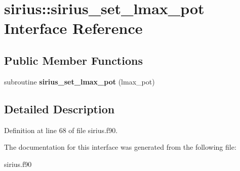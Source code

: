\hypertarget{interfacesirius_1_1sirius__set__lmax__pot}{}\section{sirius\+:\+:sirius\+\_\+set\+\_\+lmax\+\_\+pot Interface Reference}
\label{interfacesirius_1_1sirius__set__lmax__pot}
\subsection*{Public Member Functions}
\begin{DoxyCompactItemize}
\item 
\hypertarget{interfacesirius_1_1sirius__set__lmax__pot_a79d79b50033b17f641af63d78c812b62}{}subroutine {\bfseries sirius\+\_\+set\+\_\+lmax\+\_\+pot} (lmax\+\_\+pot)\label{interfacesirius_1_1sirius__set__lmax__pot_a79d79b50033b17f641af63d78c812b62}

\end{DoxyCompactItemize}


\subsection{Detailed Description}


Definition at line 68 of file sirius.\+f90.



The documentation for this interface was generated from the following file\+:\begin{DoxyCompactItemize}
\item 
sirius.\+f90\end{DoxyCompactItemize}
